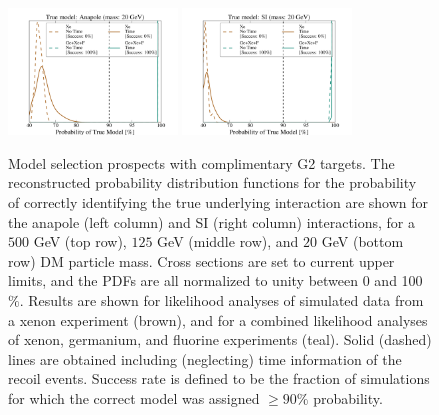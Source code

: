 \documentclass[11pt]{article}
\begin{document}
\begin{figure}
\includegraphics[width=0.4\textwidth, trim=.6cm 0.0cm .6cm 0.0cm,clip=true]{plots/PDF_Single_20GeV_Anapole_50sims_Xe_vs_FGeXe_GF_TNT.pdf}
\includegraphics[width=0.4\textwidth, trim=.6cm 0.0cm .6cm 0.0cm,clip=true]{plots/PDF_Single_20GeV_SI_Higgs_50sims_Xe_vs_FGeXe_GF_TNT.pdf}
\caption{\label{fig:gen2}
Model selection prospects with complimentary G2 targets. The reconstructed probability distribution functions for the probability of correctly identifying the true underlying interaction are shown for the anapole (left column) and SI (right column) interactions, for a $500$ GeV (top row), $125$ GeV (middle row), and $20$ GeV (bottom row) DM particle mass. Cross sections are set to current upper limits, and the PDFs are all normalized to unity between 0 and 100$\%$. Results are shown for likelihood analyses of simulated data from a xenon experiment (brown), and for a combined likelihood analyses of xenon, germanium, and fluorine experiments (teal). Solid (dashed) lines are obtained including (neglecting) time information of the recoil events. Success rate is defined to be the fraction of simulations for which the correct model was assigned $ \geq 90\%$ probability.}
\end{figure}
\end{document}
